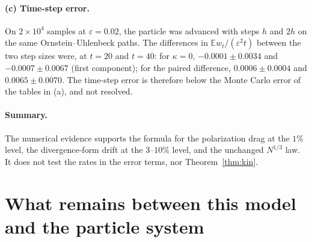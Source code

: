 \documentclass[11pt]{article}
\newcommand{\E}{\mathbb{E}}
\newcommand{\eps}{\varepsilon}
\theoremstyle{remark}
\begin{document}
\paragraph{(c) Time-step error.} On $2\times10^4$ samples at $\eps=0.02$,
the particle was advanced with steps $h$ and $2h$ on the same
Ornstein--Uhlenbeck paths. The differences in $\E w_t/(\eps^2t)$ between the
two step sizes were, at $t=20$ and $t=40$: for $\kappa=0$,
$-0.0001\pm0.0034$ and $-0.0007\pm0.0067$ (first component); for the paired
difference, $0.0006\pm0.0004$ and $0.0065\pm0.0070$. The time-step error is
therefore below the Monte Carlo error of the tables in (a), and not resolved.

\paragraph{Summary.} The numerical evidence supports the formula for the
polarization drag at the $1\%$ level, the divergence-form drift at the
$3$--$10\%$ level, and the unchanged $N^{1/3}$ law. It does not test the
rates in the error terms, nor Theorem~\ref{thm:kin}.

\section{What remains between this model and the particle system}
\end{document}
